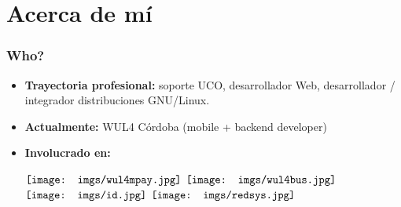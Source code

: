\section{Acerca de mí}
\frame
{
\frametitle{Who?}
\begin{itemize}
\item \textbf{Trayectoria profesional:} soporte UCO, desarrollador Web, desarrollador / integrador distribuciones GNU/Linux.
\item \textbf{Actualmente:} WUL4 Córdoba (mobile + backend developer)
\item \textbf{Involucrado en:}
\begin{center}
  $\vcenter{\hbox{\texttt{[image: imgs/wul4mpay.jpg]}}}$
  $\vcenter{\hbox{\texttt{[image: imgs/wul4bus.jpg]}}}$
  $\vcenter{\hbox{\texttt{[image: imgs/id.jpg]}}}$
  $\vcenter{\hbox{\texttt{[image: imgs/redsys.jpg]}}}$
\end{center}
\end{itemize}
}
